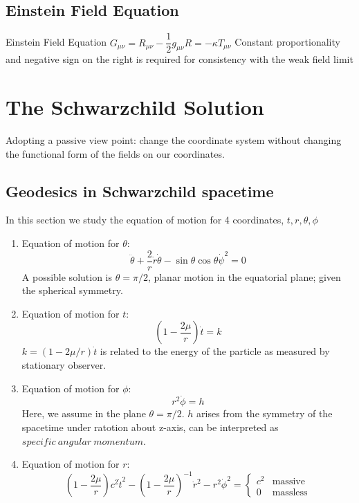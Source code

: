 \documentclass[12pt,a4paper]{article}
\begin{document}
    \subsection{Einstein Field Equation}
    \begin{definition}
        {Einstein Field Equation}
        {$G_{\mu\nu}=R_{\mu\nu}-\dfrac{1}{2}g_{\mu\nu}R=-\kappa T_{\mu\nu}$}
        {Constant proportionality and negative sign on the right is required for consistency with the weak field limit}
    \end{definition}
\section{The Schwarzchild Solution}
Adopting a passive view point: change the coordinate system without changing the functional form of the fields on our coordinates.
\subsection{Geodesics in Schwarzchild spacetime}
In this section we study the equation of motion for 4 coordinates, $t,r,\theta,\phi$
    \begin{enumerate}
        \item Equation of motion for $\theta$:
        \begin{equation}
            \ddot{\theta}+\frac{2}{r}\dot{r}\dot{\theta} - \sin{\theta}\cos{\theta}\dot{\psi}^2 = 0
        \end{equation}
        A possible solution is $\theta = \pi/2$, planar motion in the equatorial plane; given the spherical symmetry.
        \item Equation of motion for $t$:
        \begin{equation}
            (1-\frac{2\mu}{r})\dot{t} = k
        \end{equation}
        $k = (1-2\mu/r)\dot {t}$ is related to the energy of the particle as measured by stationary observer.
        \item Equation of motion for $\phi$:
        \begin{equation}
            r^2\dot{\phi} = h
        \end{equation}
        Here, we assume in the plane $\theta= \pi/2$. $h$ arises from the symmetry of the spacetime under ratotion about z-axis, can be interpreted as $specific \ angular\ momentum$.
        \item Equation of motion for $r$:\\
        \begin{equation}
            (1-\frac{2\mu}{r})c^2\dot{t}^2 - (1-\frac{2\mu}{r})^{-1} \dot{r}^2 - r^2\dot{\phi}^2 =
            \begin{cases}
                c^2 & \text{massive}\\
                0 & \text{massless}
            \end{cases}
        \end{equation}
    \end{enumerate}
\end{document}
